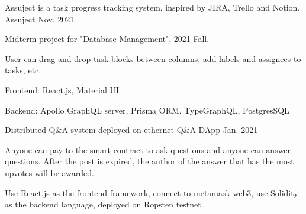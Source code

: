 

\begin{cventries}

  \cventry
    {Assuject is a task progress tracking system, inspired by JIRA, Trello and Notion.}
    {Assuject \href{https://github.com/MortalHappiness/DBM2021FallMidtermProject}{\color{red}{[Github Link]}}}
    {}
    {Nov. 2021} %
    {
      \begin{cvitems} %
        \item {Midterm project for "Database Management", 2021 Fall.}
        \item {User can drag and drop task blocks between columns, add labels and assignees to tasks, etc.}
        \item {Frontend: React.js, Material UI}
        \item {Backend: Apollo GraphQL server, Prisma ORM, TypeGraphQL, PostgresSQL}
      \end{cvitems}
    }

  \cventry
    {Distributed Q\&A system deployed on ethernet}
    {Q\&A DApp \href{https://github.com/MortalHappiness/NMLab2020Fall-Final}{\color{red}{[Github Link]}}}
    {}
    {Jan. 2021} %
    {
      \begin{cvitems} %
        \item {Anyone can pay to the smart contract to ask questions and anyone can answer questions. After the post is expired, the author of the answer that has the most upvotes will be awarded.}
        \item {Use React.js as the frontend framework, connect to metamask web3, use Solidity as the backend language, deployed on Ropsten testnet.}
      \end{cvitems}
    }


\end{cventries}
